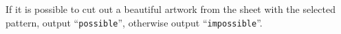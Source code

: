 
    If it is possible to cut out a beautiful artwork from the sheet with the selected pattern,
    output ``\texttt{possible}'', otherwise output ``\texttt{impossible}''.

